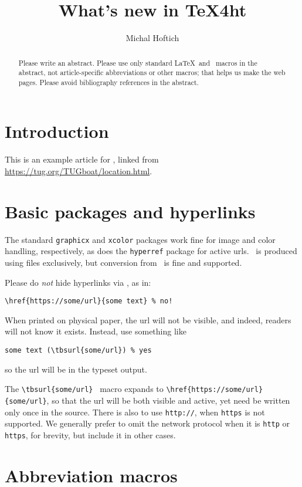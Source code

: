 \documentclass{ltugboat}
\title{What's new in \TeX4ht}
\author{Michal Hoftich}
\begin{document}
\maketitle

\begin{abstract}
Please write an abstract. Please use only standard \LaTeX\ and \TUB\
macros in the abstract, not article-specific abbreviations or other
macros; that helps us make the web pages. Please avoid bibliography
references in the abstract.
\end{abstract}

\section{Introduction}

This is an example article for \TUB, linked from
\url{https://tug.org/TUGboat/location.html}.

\section{Basic packages and hyperlinks}

The standard \texttt{graphicx} and \texttt{xcolor} packages work fine
for image and color handling, respectively, as does the
\texttt{hyperref} package for active urls. \TUB\ is produced using
\acro{PDF} files exclusively, but conversion from \DVI\ is fine and supported.

Please do \emph{not} hide hyperlinks via , as in:
\begin{verbatim}
\href{https://some/url}{some text} % no!
\end{verbatim}
When printed on physical paper, the url will not be visible, and indeed,
readers will not know it exists. Instead, use something like
\begin{verbatim}
some text (\tbsurl{some/url}) % yes
\end{verbatim}
so the url will be in the typeset output.

The \verb|\tbsurl{some/url}| \TUB\ macro expands to
\verb|\href{https://some/url}{some/url}|, so that the url will be both
visible and active, yet need be written only once in the source. There
is also \cs{tbhurl} to use \texttt{http://}, when \texttt{https} is not
supported. We generally prefer to omit the network protocol when it is
\texttt{http} or \texttt{https}, for brevity, but include it in other
cases.

\section{Abbreviation macros}
\end{document}
